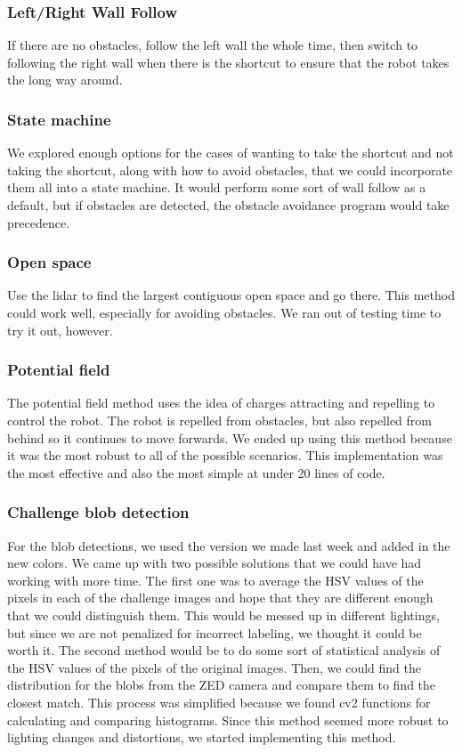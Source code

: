 \documentclass[journal, a4paper]{IEEEtran}
\begin{document}
\subsubsection{Left/Right Wall Follow}
If there are no obstacles, follow the left wall the whole time, then switch to following the right wall when there is the shortcut to ensure that the robot takes the long way around.
\subsubsection{State machine}
We explored enough options for the cases of wanting to take the shortcut and not taking the shortcut, along with how to avoid obstacles, that we could incorporate them all into a state machine. It would perform some sort of wall follow as a default, but if obstacles are detected, the obstacle avoidance program would take precedence. 
\subsubsection{Open space}
Use the lidar to find the largest contiguous open space and go there. This method could work well, especially for avoiding obstacles. We ran out of testing time to try it out, however. 
\subsubsection{Potential field}
The potential field method uses the idea of charges attracting and repelling to control the robot. The robot is repelled from obstacles, but also repelled from behind so it continues to move forwards. We ended up using this method because it was the most robust to all of the possible scenarios. This implementation was the most effective and also the most simple at under 20 lines of code. 

\subsubsection{Challenge blob detection} For the blob detections, we used the version we made last week and added in the new colors. We came up with two possible solutions that we could have had working with more time. The first one was to average the HSV values of the pixels in each of the challenge images and hope that they are different enough that we could distinguish them. This would be messed up in different lightings, but since we are not penalized for incorrect labeling, we thought it could be worth it. The second method would be to do some sort of statistical analysis of the HSV values of the pixels of the original images. Then, we could find the distribution for the blobs from the ZED camera and compare them to find the closest match. This process was simplified because we found cv2 functions for calculating and comparing histograms. Since this method seemed more robust to lighting changes and distortions, we started implementing this method. 
\end{document}
